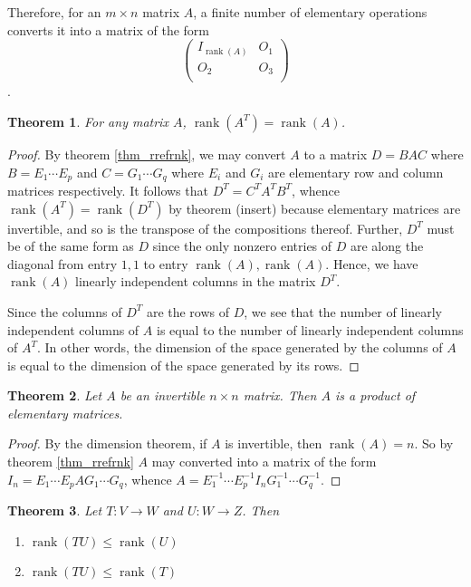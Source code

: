 \documentclass[oneside, 12pt]{book}
\DeclareMathOperator{\rank}{rank}
\newtheorem{thm}{Theorem}[section]
\theoremstyle{definition}
\begin{document}
Therefore, for an $m \times n$ matrix $A$, a finite number of elementary operations converts it into a matrix of the form
\[\begin{pmatrix}
    I_{\rank(A)} & O_{1} \\
    O_{2} & O_{3} \\
  \end{pmatrix}\].
\begin{thm}
\label{thm_colrow}
  For any matrix $A$, $\rank(A^{T})=\rank(A)$.
\end{thm}
\begin{proof}
  By theorem \ref{thm_rrefrnk}, we may convert $A$ to a matrix $D=BAC$ where $B=E_{1}\cdots E_{p}$ and $C=G_{1}\cdots G_{q}$ where $E_{i}$ and $G_{i}$ are elementary row and column matrices respectively. It follows that $D^{T}=C^{T}A^{T}B^{T}$, whence $\rank(A^{T})=\rank(D^{T})$ by theorem (insert) because elementary
  matrices are invertible, and so is the transpose of the compositions thereof. Further, $D^{T}$ must be of the same form as $D$ since the only nonzero entries of $D$ are along the diagonal from entry $1,1$ to entry $\rank(A), \rank(A)$. Hence, we have $\rank(A)$ linearly independent columns in the matrix $D^{T}$.

  Since the columns of $D^{T}$ are the rows of $D$, we see that the number of linearly independent columns of $A$ is equal to the number of linearly
  independent columns of $A^{T}$. In other words, the dimension of the space generated  by the columns of $A$ is equal to the dimension of the space generated by its rows.
\end{proof}
\begin{thm}
\label{thm_invm}
  Let $A$ be an invertible $n \times n$ matrix. Then $A$ is a product of elementary matrices.
\end{thm}
\begin{proof}
  By the dimension theorem, if $A$ is invertible,  then $\rank(A)=n$. So by theorem \ref{thm_rrefrnk} $A$ may converted into a matrix of the form
  $I_{n}=E_{1}\cdots E_{p}AG_{1} \cdots G_{q}$, whence $A=E_{1}^{-1}\cdots E_{p}^{-1}I_{n}G_{1}^{-1}\cdots G_{q}^{-1}$.
\end{proof}
\begin{thm}
\label{thm_rnkinq}
  Let $T:V \to W$ and $U:W \to Z$.  Then
  \begin{enumerate}
    \item $\rank(TU)\leq \rank(U)$
    \item $\rank(TU) \leq \rank(T)$
  \end{enumerate}
\end{thm}
\end{document}
